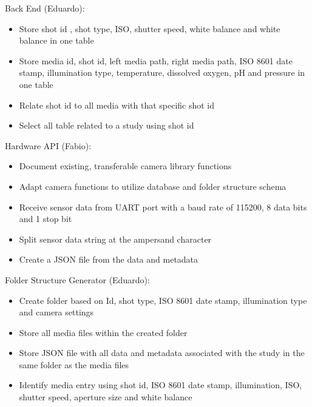 Back End (Eduardo):
\begin{itemize}
	\item Store shot id , shot type, ISO, shutter speed, white balance and white balance in one table
	\item Store media id, shot id, left media path, right media path, ISO 8601 date stamp, illumination type, temperature, dissolved oxygen, pH and pressure in one table
	\item Relate shot id to all media with that specific shot id
	\item Select all table related to a study using shot id
\end{itemize}
Hardware API (Fabio):
\begin{itemize}
	\item Document existing, transferable camera library functions
	\item Adapt camera functions to utilize database and folder structure schema
	\item Receive sensor data from UART port with a baud rate of 115200, 8 data bits and 1 stop bit
	\item Split sensor data string at the ampersand character
	\item Create a JSON file from the data and metadata
\end{itemize}
Folder Structure Generator (Eduardo):
\begin{itemize}
	\item Create folder based on Id, shot type, ISO 8601 date stamp, illumination type and camera settings
	\item Store all media files within the created folder
	\item Store JSON file with all data and metadata associated with the study in the same folder as the media files
	\item Identify media entry using shot id, ISO 8601 date stamp, illumination, ISO, shutter speed, aperture size and white balance
\end{itemize}
